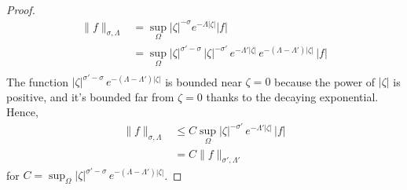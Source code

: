\documentclass{article}
\theoremstyle{plain}
\begin{document}
\begin{proof}
    \begin{align*}
        \|f\|_{\sigma,\Lambda}&=\sup_{\Omega} |\zeta|^{-\sigma}  e^{-\Lambda |\zeta|} |f|\\
        &= \sup_{\Omega} |\zeta|^{\sigma'-\sigma}\,|\zeta|^{-\sigma'}\,e^{-\Lambda'|\zeta|}\,  e^{-(\Lambda-\Lambda') |\zeta|} \, |f|\\
    \end{align*}
    The function $|\zeta|^{\sigma'-\sigma}\,  e^{-(\Lambda-\Lambda') |\zeta|}$ is bounded near $\zeta = 0$ because the power of $|\zeta|$ is positive, and it's bounded far from $\zeta = 0$ thanks to the decaying exponential. Hence,
    \begin{align*}
       \|f\|_{\sigma,\Lambda}&\leq C\sup_\Omega  |\zeta|^{-\sigma'}\, e^{-\Lambda'|\zeta|} \, |f|\\
        &=C \|f\|_{\sigma',\Lambda'}
    \end{align*}
    for $C = \sup_{\Omega}  |\zeta|^{\sigma'-\sigma}\,  e^{-(\Lambda-\Lambda') |\zeta|}$.
\end{proof}
\end{document}
